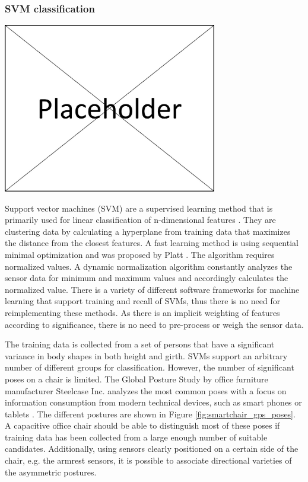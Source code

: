 \subsubsection*{SVM classification}
\begin{minipage}{\linewidth}
\centering
\includegraphics[width=0.7\textwidth]{images/placeholder}
\label{fig:smartchair_gps_poses}
\end{minipage}

Support vector machines (SVM) are a supervised learning method that is primarily used for linear classification of n-dimensional features \cite{hearst1998support}. They are clustering data by calculating a hyperplane from training data that maximizes the distance from the closest features. A fast learning method is using sequential minimal optimization and was proposed by Platt \cite{platt1999fast}. The algorithm requires normalized values. A dynamic normalization algorithm constantly analyzes the sensor data for minimum and maximum values and accordingly calculates the normalized value. There is a variety of different software frameworks for machine learning that support training and recall of SVMs, thus there is no need for reimplementing these methods. As there is an implicit weighting of features according to significance, there is no need to pre-process or weigh the sensor data.

The training data is collected from a set of persons that have a significant variance in body shapes in both height and girth. SVMs support an arbitrary number of different groups for classification. However, the number of significant poses on a chair is limited. The Global Posture Study by office furniture manufacturer Steelcase Inc. analyzes the most common poses with a focus on information consumption from modern technical devices, such as smart phones or tablets \cite{globalPosture}. The different postures are shown in Figure \ref{fig:smartchair_gps_poses}. A capacitive office chair should be able to distinguish most of these poses if training data has been collected from a large enough number of suitable candidates. Additionally, using sensors clearly positioned on a certain side of the chair, e.g. the armrest sensors, it is possible to associate directional varieties of the asymmetric postures.